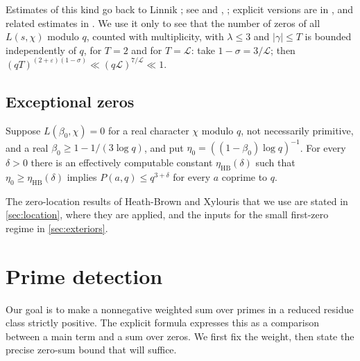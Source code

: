 \documentclass[11pt]{amsart}
\numberwithin{equation}{section}
\theoremstyle{plain}
\theoremstyle{definition}
\theoremstyle{remark}
\newcommand{\LL}{\mathcal{L}}
\newcommand{\eps}{\varepsilon}
\newcommand{\1}{\mathbf{1}}
\begin{document}
Estimates of this kind go back to Linnik \cite{Linnik1944least,Linnik1944deuring}; see
\cite{Turan1961density,Fogels1965zeros,Gallagher1970large,Montgomery1971topics,Jutila1977linnik,
Motohashi1975density,Bombieri1987grand} and \cite[(1.4)]{HeathBrown1992zero},
\cite[Prinzip~3, p.~11]{Xylouris2011nullstellen}; explicit versions are in
\cite{ThornerZaman2024explicit}, and related estimates in
\cite{Ingham1940estimation,Huxley1972difference,Jutila1972density,HeathBrown1979density,
SoundararajanThorner2019weak,Pintz2019some}. We use it only to see that the number of zeros of all
$L(s,\chi)$ modulo $q$, counted with multiplicity, with $\lambda\le3$ and $|\gamma|\le T$ is bounded
independently of $q$, for $T=2$ and for $T=\LL$: take $1-\sigma=3/\LL$; then
$(qT)^{(2+\eps)(1-\sigma)}\ll(q\LL)^{7/\LL}\ll1$.

\subsection{Exceptional zeros}

\begin{inp}\label{inp:siegel}
Suppose $L(\beta_0,\chi)=0$ for a real character $\chi$ modulo $q$, not necessarily primitive,
and a real $\beta_0\ge1-1/(3\log q)$, and put $\eta_0=((1-\beta_0)\log q)^{-1}$. For every $\delta>0$
there is an effectively computable constant $\eta_{\mathrm{HB}}(\delta)$ such that $\eta_0\ge\eta_{\mathrm{HB}}(\delta)$
implies $P(a,q)\le q^{3+\delta}$ for every $a$ coprime to $q$.
\end{inp}

The zero-location results of Heath-Brown and Xylouris that we use are stated in
\cref{sec:location}, where they are applied, and the inputs for the small first-zero regime in
\cref{sec:exteriors}.

\section{Prime detection}\label{sec:detection}

Our goal is to make a nonnegative weighted sum over primes in a reduced residue class
strictly positive. The explicit formula expresses this as a comparison between a main
term and a sum over zeros. We first fix the weight, then state the precise zero-sum
bound that will suffice.
\end{document}

